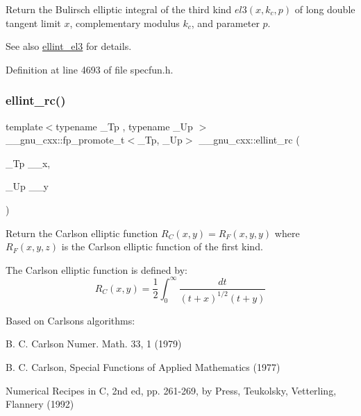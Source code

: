 Return the Bulirsch elliptic integral of the third kind $ el3(x,k_c,p) $ of {\ttfamily long double} tangent limit $ x $, complementary modulus $ k_c $, and parameter $ p $.

\begin{DoxySeeAlso}{See also}
\hyperlink{group__gnu__math__spec__func_gaac07922e08fdf46cd509ff0cfa9ea1f0}{ellint\+\_\+el3} for details. 
\end{DoxySeeAlso}


Definition at line 4693 of file specfun.\+h.

\mbox{\label{group__gnu__math__spec__func_ga7d3d42f5f71a74266be8aaca528056bf}} 
\subsubsection{\texorpdfstring{ellint\+\_\+rc()}{ellint\_rc()}}
{\footnotesize\ttfamily template$<$typename \+\_\+\+Tp , typename \+\_\+\+Up $>$ \\
\+\_\+\+\_\+gnu\+\_\+cxx\+::fp\+\_\+promote\+\_\+t$<$\+\_\+\+Tp, \+\_\+\+Up$>$ \+\_\+\+\_\+gnu\+\_\+cxx\+::ellint\+\_\+rc (\begin{DoxyParamCaption}\item[{\+\_\+\+Tp}]{\+\_\+\+\_\+x,  }\item[{\+\_\+\+Up}]{\+\_\+\+\_\+y }\end{DoxyParamCaption})\hspace{0.3cm}{\ttfamily [inline]}}

Return the Carlson elliptic function $ R_C(x,y) = R_F(x,y,y) $ where $ R_F(x,y,z) $ is the Carlson elliptic function of the first kind.

The Carlson elliptic function is defined by\+: \[ R_C(x,y) = \frac{1}{2} \int_0^\infty \frac{dt}{(t + x)^{1/2}(t + y)} \]

Based on Carlson\textquotesingle{}s algorithms\+:
\begin{DoxyItemize}
\item B. C. Carlson Numer. Math. 33, 1 (1979)
\item B. C. Carlson, Special Functions of Applied Mathematics (1977)
\item Numerical Recipes in C, 2nd ed, pp. 261-\/269, by Press, Teukolsky, Vetterling, Flannery (1992)
\end{DoxyItemize}


